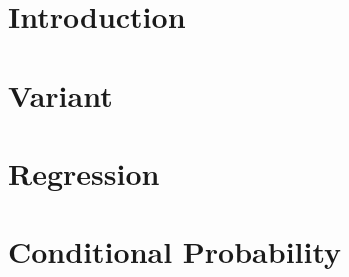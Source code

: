 \documentclass[12pt,letterpaper,oneside]{book}
\theoremstyle{plain}
\theoremstyle{definition}
\theoremstyle{remark}
\numberwithin{theorem}{chapter}
\begin{document}

\makeatletter
\if@twoside \setcounter{page}{4} \else \setcounter{page}{1} \fi
\makeatother



%


\chapter{Introduction}


\chapter{Variant}


\chapter{Regression}



\appendix
\chapter{Conditional Probability}




\end{document}
